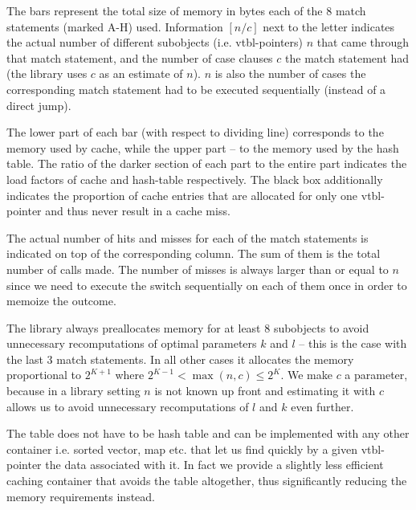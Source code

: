 The bars represent the total size of memory in bytes each of the 8 match 
statements (marked A-H) used. Information $[n/c]$ next to the letter indicates the 
actual number of different subobjects (i.e. vtbl-pointers) $n$ that came through 
that match statement, and the number of case clauses $c$ the match statement had 
(the library uses $c$ as an estimate of $n$). $n$ is also the number of cases the 
corresponding match statement had to be executed sequentially (instead of a 
direct jump).

The lower part of each bar (with respect to dividing line) corresponds to the memory used by cache, while the 
upper part -- to the memory used by the hash table. The ratio of the darker
section of each part to the entire part indicates the load factors 
of cache and hash-table respectively. The black box additionally indicates the 
proportion of cache entries that are allocated for only one vtbl-pointer and 
thus never result in a cache miss. %

The actual number of hits and misses for each of the match statements is 
indicated on top of the corresponding column. The sum of them is the total 
number of calls made. %
The number of misses is always larger than or equal to $n$ since we need to 
execute the switch sequentially on each of them once in order to memoize the 
outcome.

The library always preallocates memory for at least 8 subobjects to avoid 
unnecessary recomputations of optimal parameters $k$ and $l$ -- this is the case 
with the last 3 match statements. In all other cases it allocates the 
memory proportional to $2^{K+1}$ where $2^{K-1} < \max(n,c) \le 2^{K}$. We make 
$c$ a parameter, because in a library setting $n$ is not known up front and 
estimating it with $c$ allows us to avoid unnecessary recomputations of $l$ and 
$k$ even further. 

The table does not have to be hash table and can be implemented with 
any other container i.e. sorted vector, map etc. that let us find quickly by a given 
vtbl-pointer the data associated with it. In fact we provide a slightly less 
efficient caching container that avoids the table altogether, thus significantly 
reducing the memory requirements instead.

